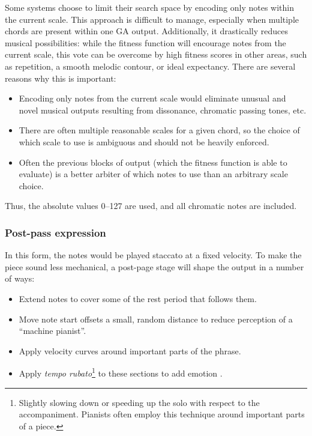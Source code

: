 Some systems choose to limit their search space by encoding only notes within the current scale. This approach is difficult to manage, especially when multiple chords are present within one GA output. Additionally, it drastically reduces musical possibilities: while the fitness function will encourage notes from the current scale, this vote can be overcome by high fitness scores in other areas, such as repetition, a smooth melodic contour, or ideal expectancy. There are several reasons why this is important:

\begin{itemize}
\item Encoding only notes from the current scale would eliminate unusual and novel musical outputs resulting from dissonance, chromatic passing tones, etc.
\item There are often multiple reasonable scales for a given chord, so the choice of which scale to use is ambiguous and should not be heavily enforced.
\item Often the previous blocks of output (which the fitness function is able to evaluate) is a better arbiter of which notes to use than an arbitrary scale choice.
\end{itemize}

Thus, the absolute values 0--127 are used, and all chromatic notes are included.

\subsubsection{Post-pass expression}

In this form, the notes would be played staccato at a fixed velocity. To make the piece sound less mechanical, a post-page stage will shape the output in a number of ways:

\begin{itemize}
	\item Extend notes to cover some of the rest period that follows them.
	\item Move note start offsets a small, random distance to reduce perception of a ``machine pianist''.
	\item Apply velocity curves around important parts of the phrase.
	\item Apply \emph{tempo rubato}\footnote{Slightly slowing down or speeding up the solo with respect to the accompaniment. Pianists often employ this technique around important parts of a piece.} to these sections to add emotion \citep{todd89}.
\end{itemize}

